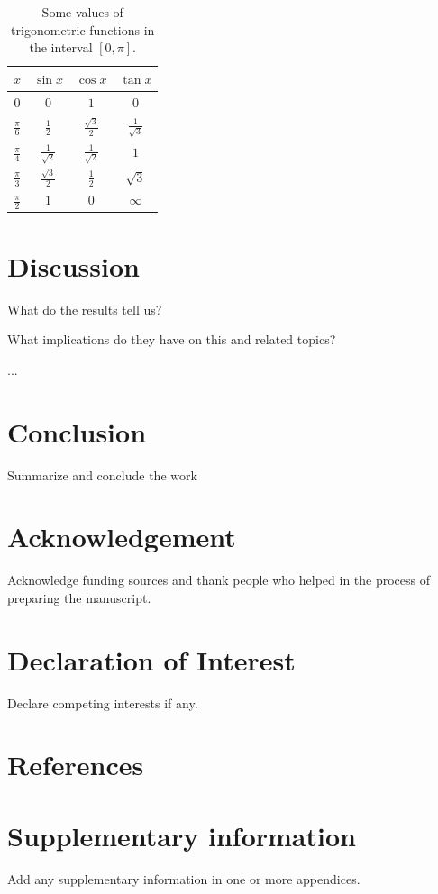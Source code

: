 \documentclass[11pt,review]{elsarticle}
\begin{document}
\begin{table}
\centering
\begin{threeparttable}[b]
\begin{tabular}{cccc}
\toprule
$x$ & $\sin x$ & $\cos x$ & $\tan x$\\
\midrule
$0$ & $0$ & $1$ & $0$\\
$\frac{\pi}{6}$ & $\frac{1}{2}$ & $\frac{\sqrt{3}}{2}$ & $\frac{1}{\sqrt{3}}$\\
$\frac{\pi}{4}$ & $\frac{1}{\sqrt{2}}$ & $\frac{1}{\sqrt{2}}$ & $1$\\
$\frac{\pi}{3}$ & $\frac{\sqrt{3}}{2}$ & $\frac{1}{2}$ & $\sqrt{3}$\\
$\frac{\pi}{2}$ & $1$ & $0$ & $\infty$\\
\bottomrule
\end{tabular}
\end{threeparttable}
\caption{Some values of trigonometric functions in the interval $[0,\pi]$.}
\label{tab:sine}
\end{table}

\section{Discussion} \label{sec:discussion}
What do the results tell us? 

What implications do they have on this and related topics?

...

\section{Conclusion} \label{sec:conclusion}
Summarize and conclude the work

\section*{Acknowledgement}
Acknowledge funding sources and thank people who helped in the process of preparing the manuscript.

\section*{Declaration of Interest}
Declare competing interests if any.

\section*{References}



\appendix

\section{Supplementary information} \label{app:si}

Add any supplementary information in one or more appendices. 
\end{document}
